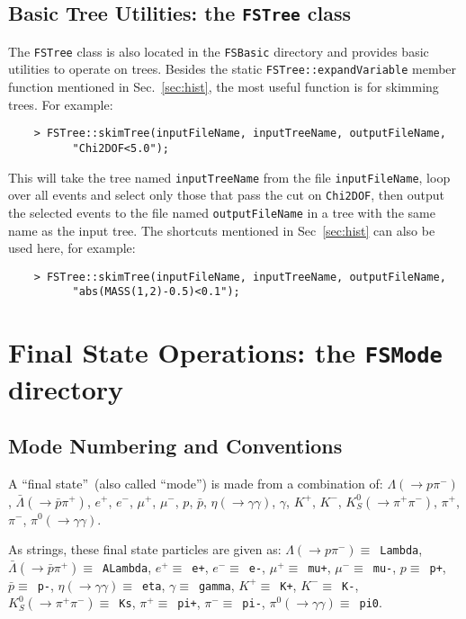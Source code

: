 \documentclass[11pt]{article}
\begin{document}
\subsection{Basic Tree Utilities: the {\tt FSTree} class}
\label{sec:tree}

The {\tt FSTree} class is also located in the {\tt FSBasic} directory and provides basic utilities to operate on trees.  
Besides the static {\tt FSTree::expandVariable} member function mentioned in Sec.~\ref{sec:hist}, the most useful function is for skimming trees.  For example:
\begin{verbatim}
    > FSTree::skimTree(inputFileName, inputTreeName, outputFileName,
          "Chi2DOF<5.0"); 
\end{verbatim}
This will take the tree named {\tt inputTreeName} from the file {\tt inputFileName}, loop over all events and select only those that pass the cut on {\tt Chi2DOF}, then output the selected events to the file named {\tt outputFileName} in a tree with the same name as the input tree.  The shortcuts mentioned in Sec~\ref{sec:hist} can also be used here, for example:
\begin{verbatim}
    > FSTree::skimTree(inputFileName, inputTreeName, outputFileName,
          "abs(MASS(1,2)-0.5)<0.1"); 
\end{verbatim}


\section{Final State Operations:  the {\tt FSMode} directory}
\label{sec:modes}

\subsection{Mode Numbering and Conventions}
\label{sec:modeconv}

A ``final state''~(also called ``mode'') is made from a combination of: $\Lambda (\to p \pi^-)$, $\bar{\Lambda} (\to \bar{p} \pi^+)$, $e^+$, $e^-$, $\mu^+$, $\mu^-$, $p$, $\bar{p}$, $\eta (\to \gamma\gamma)$, $\gamma$, $K^+$, $K^-$, $K^0_S (\to \pi^+\pi^-)$, $\pi^+$, $\pi^-$, $\pi^0 (\to \gamma\gamma)$.

As strings, these final state particles are given as:
$\Lambda (\to p \pi^-) \equiv $~{\tt Lambda}, 
$\bar{\Lambda} (\to \bar{p} \pi^+) \equiv $~{\tt ALambda}, 
$e^+ \equiv $~{\tt e+}, 
$e^- \equiv $~{\tt e-}, 
$\mu^+ \equiv $~{\tt mu+},  
$\mu^- \equiv $~{\tt mu-}, 
$p \equiv $~{\tt p+}, 
$\bar{p} \equiv $~{\tt p-}, 
$\eta (\to \gamma\gamma) \equiv $~{\tt eta}, 
$\gamma \equiv $~{\tt gamma}, 
$K^+ \equiv $~{\tt K+}, 
$K^- \equiv $~{\tt K-}, 
$K^0_S (\to \pi^+\pi^-) \equiv $~{\tt Ks}, 
$\pi^+ \equiv $~{\tt pi+}, 
$\pi^- \equiv $~{\tt pi-}, 
$\pi^0 (\to \gamma\gamma) \equiv $~{\tt pi0}.
\end{document}
